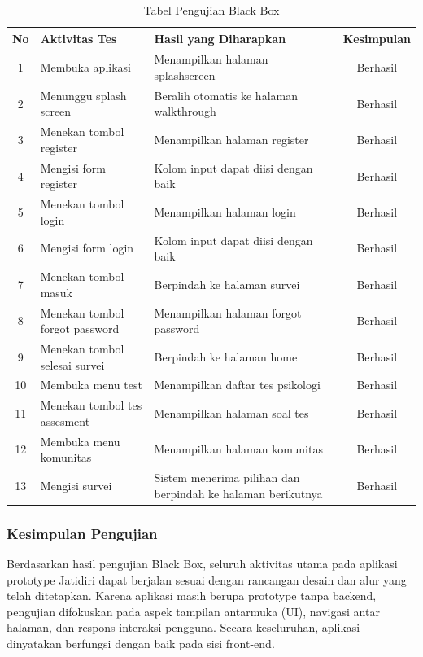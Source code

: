 \begin{table}[h!]
\centering
\caption{Tabel Pengujian Black Box}
\small
\begin{tabular}{|c|l|l|c|}
\hline
No & Aktivitas Tes & Hasil yang Diharapkan & Kesimpulan \\
\hline
1 & Membuka aplikasi & Menampilkan halaman splashscreen & Berhasil \\
\hline
2 & Menunggu splash screen & Beralih otomatis ke halaman walkthrough & Berhasil \\
\hline
3 & Menekan tombol register & Menampilkan halaman register & Berhasil \\
\hline
4 & Mengisi form register & Kolom input dapat diisi dengan baik & Berhasil \\
\hline
5 & Menekan tombol login & Menampilkan halaman login & Berhasil \\
\hline
6 & Mengisi form login & Kolom input dapat diisi dengan baik & Berhasil \\
\hline
7 & Menekan tombol masuk & Berpindah ke halaman survei & Berhasil \\
\hline
8 & Menekan tombol forgot password & Menampilkan halaman forgot password & Berhasil \\
\hline
9 & Menekan tombol selesai survei & Berpindah ke halaman home & Berhasil \\
\hline
10 & Membuka menu test & Menampilkan daftar tes psikologi & Berhasil \\
\hline
11 & Menekan tombol tes assesment & Menampilkan halaman soal tes & Berhasil \\
\hline
12 & Membuka menu komunitas & Menampilkan halaman komunitas & Berhasil \\
\hline
13 & Mengisi survei & Sistem menerima pilihan dan berpindah ke halaman berikutnya & Berhasil \\
\hline
\end{tabular}
\end{table}


\subsubsection{Kesimpulan Pengujian}

Berdasarkan hasil pengujian Black Box, seluruh aktivitas utama pada aplikasi prototype Jatidiri dapat berjalan sesuai dengan rancangan desain dan alur yang telah ditetapkan. Karena aplikasi masih berupa prototype tanpa backend, pengujian difokuskan pada aspek tampilan antarmuka (UI), navigasi antar halaman, dan respons interaksi pengguna. Secara keseluruhan, aplikasi dinyatakan berfungsi dengan baik pada sisi front-end.

